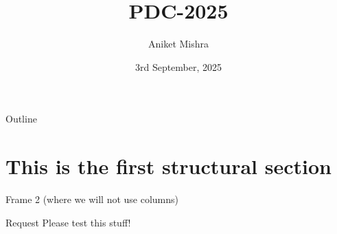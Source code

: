 \documentclass[presentation]{beamer}
\author{Aniket Mishra}
\date{3rd September, 2025}
\title{PDC-2025}
\begin{document}
\maketitle
\begin{frame}{Outline}
\tableofcontents
\end{frame}

\section{This is the first structural section}
\label{sec:org57e0715}
\begin{frame}[label={sec:org9b58b5b}]{Frame 2 (where we will not use columns)}
\begin{block}{Request}
Please test this stuff!
\end{block}
\end{frame}
\end{document}
